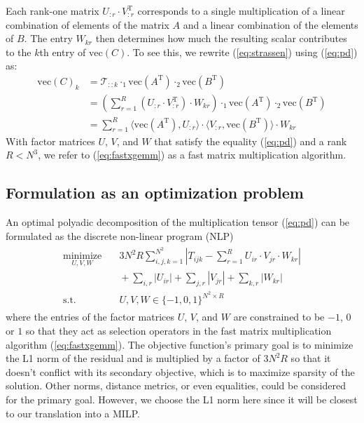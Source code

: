 \documentclass{article}
\begin{document}
Each rank-one matrix $U_{:r} \cdot V_{:r}^{\mathrm{T}}$ corresponds to a single multiplication of a linear combination of elements of the matrix $A$ and a linear combination of the elements of $B$. The entry $W_{kr}$ then determines how much the resulting scalar contributes to the $k$th entry of $\mathrm{vec}(C)$. To see this, we rewrite (\ref{eq:strassen}) using (\ref{eq:pd}) as:
\begin{align}
    \mathrm{vec}(C)_k &= \mathcal{T}_{::k} \cdot_1 \mathrm{vec}(A^\mathrm{T}) \cdot_2 \mathrm{vec}(B^\mathrm{T}) \\
    &= \left(\sum_{r=1}^R (U_{:r} \cdot V_{:r}^{\mathrm{T}}) \cdot W_{kr}\right) \cdot_1 \mathrm{vec}(A^\mathrm{T}) \cdot_2 \mathrm{vec}(B^\mathrm{T}) \\
    &= \sum_{r=1}^R \langle \mathrm{vec}(A^\mathrm{T}), U_{:r} \rangle \cdot \langle V_{:r}, \mathrm{vec}(B^\mathrm{T}) \rangle \cdot W_{kr} \label{eq:fastxgemm}
\end{align}
With factor matrices $U$, $V$, and $W$ that satisfy the equality (\ref{eq:pd}) and a rank $R < N^3$, we refer to (\ref{eq:fastxgemm}) as a fast matrix multiplication algorithm.

\subsection{Formulation as an optimization problem}

An optimal polyadic decomposition of the multiplication tensor (\ref{eq:pd}) can be formulated as the discrete non-linear program (NLP)
\begin{align}
    \label{eq:nlp}
    \begin{split}
    \underset{U,V,W}{\operatorname{minimize}} & \quad 3N^2R \sum_{i,j,k=1}^{N^2} \left| T_{ijk} - \sum_{r=1}^R U_{ir} \cdot V_{jr} \cdot W_{kr} \right|\\
    & \quad + \sum_{i,r} \left|U_{ir}\right| + \sum_{j,r} \left|V_{jr}\right| + \sum_{k,r} \left|W_{kr}\right|\\
    \mbox{s.t.} & \quad U,V,W \in \{-1,0,1\}^{N^2 \times R}
    \end{split}
\end{align}
where the entries of the factor matrices $U$, $V$, and $W$ are constrained to be $-1$, $0$ or $1$ so that they act as selection operators in the fast matrix multiplication algorithm (\ref{eq:fastxgemm}). The objective function's primary goal is to minimize the L1 norm of the residual and is multiplied by a factor of $3N^2R$ so that it doesn't conflict with its secondary objective, which is to maximize sparsity of the solution. Other norms, distance metrics, or even equalities, could be considered for the primary goal. However, we choose the L1 norm here since it will be closest to our translation into a MILP.
\end{document}
